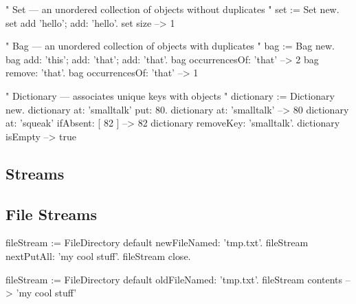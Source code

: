 \documentclass[8pt,a4paper]{leaflet}
\begin{document}
\begin{code}
" Set --- an unordered collection of objects without duplicates "
set := Set new.
set add 'hello'; add: 'hello'.
set size --> 1
\end{code}

\begin{code}
" Bag --- an unordered collection of objects with duplicates "
bag := Bag new.
bag add: 'this'; add: 'that'; add: 'that'.
bag occurrencesOf: 'that' --> 2
bag remove: 'that'.
bag occurrencesOf: 'that' --> 1
\end{code}

\begin{code}
" Dictionary --- associates unique keys with objects "
dictionary := Dictionary new.
dictionary at: 'smalltalk' put: 80.
dictionary at: 'smalltalk' --> 80
dictionary at: 'squeak' ifAbsent: [ 82 ] --> 82
dictionary removeKey: 'smalltalk'.
dictionary isEmpty --> true
\end{code}

\subsection{Streams}



\subsection{File Streams}

\begin{code}
fileStream := FileDirectory default newFileNamed: 'tmp.txt'.
fileStream nextPutAll: 'my cool stuff'.
fileStream close.

fileStream := FileDirectory default oldFileNamed: 'tmp.txt'.
fileStream contents --> 'my cool stuff'
\end{code}
\end{document}
